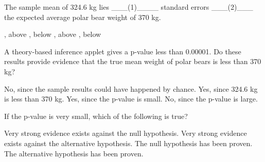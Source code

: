\documentclass{article}
\begin{document}
\begin{mcquestions}
		\question[follow] The sample mean of 324.6 kg lies \_\_\_(1)\_\_\_\_ standard errors \_\_\_(2)\_\_\_ the expected average polar bear weight of 370 kg.
		\begin{mcanswerslist}
			, above
			, below
			, above
			, below
		\end{mcanswerslist}
		
		\question[follow] A theory-based inference applet gives a p-value less than 0.00001. Do these results provide evidence that the true mean weight of polar bears is less than 370 kg?
		\begin{mcanswerslist}
			\answer No, since the sample results could have happened by chance.
			\answer Yes, since 324.6 kg is less than 370 kg.
			\answer[correct] Yes, since the p-value is small.
			\answer No, since the p-value is large.
		\end{mcanswerslist}
		
		\question If the p-value is very small, which of the following is true?
		\begin{mcanswerslist}
			\answer[correct] Very strong evidence exists against the null hypothesis.
			\answer Very strong evidence exists against the alternative hypothesis.
			\answer The null hypothesis has been proven.
			\answer The alternative hypothesis has been proven.
		\end{mcanswerslist}
		
	\end{mcquestions}
\end{document}
